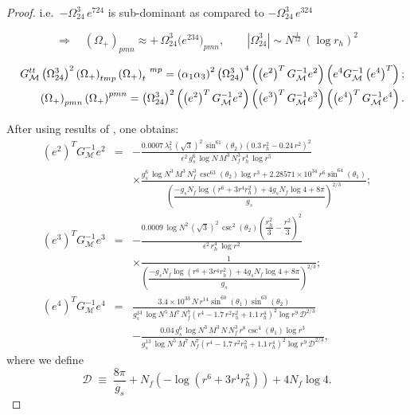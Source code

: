 \documentclass[a4paper,11pt,fleqn]{article}
\theoremstyle{plain}
\theoremstyle{definition}
\newcommand{\rh}{r_h}
\newcommand{\logN}{\log N}
\newcommand{\gsNf}{g_s N_f}
\newcommand{\logr}{\log r}
\begin{document}
\begin{proof}
\noindent i.e.\ $-\Omega_{24}^3\,e^{724}$ is sub-dominant as compared to
$-\Omega_{24}^3\,e^{324}$

\[
  \Rightarrow\quad
  \left(\Omega_{+}\right)_{pmn}
  \approx +\,\Omega_{24}^3\bigl(e^{234}\bigr)_{pmn},
  \qquad
  \left|\Omega_{24}^3\right|
  \sim N^{\frac{1}{12}}\, (\log r_h)^2
\]

\begin{eqnarray}
\label{Lag_B-ii}
& & G_{\cal M}^{tt}\left(\Omega^3_{24}\right)^2\left(\Omega_+\right)_{tmp}\left(\Omega_+\right)_t^{\ \ mp} = \left(\alpha_1\alpha_3\right)^2\left(\Omega^3_{24}\right)^4\left(\left(e^2\right)^TG_{\cal M}^{-1}e^2\right)\left(e^4 G_{\cal M}^{-1}\left(e^4\right)^T\right);\nonumber\\
& & \left(\Omega_+\right)_{pmn}\left(\Omega_+\right)^{pmn}=\left(\Omega^3_{24}\right)^2 \left(\left(e^2\right)^TG_{\cal M}^{-1}e^2\right) \left(\left(e^3\right)^TG_{\cal M}^{-1}e^3 \right)\left(\left(e^4\right)^TG_{\cal M}^{-1}e^4\right).
\end{eqnarray}



After using results of \cite{OR4}, one obtains:
%
\begin{eqnarray}
\label{einvGeTs}
\left(e^2\right)^T G_{\mathcal{M}}^{-1} e^2
&=& -\frac{0.0007\,\lambda_5^2\,(\sqrt{3})^2\,
            \sin^{61}\!\left(\theta_2\right)
            \left(0.3\,\rh^2 - 0.24\,r^2\right)^2}
          {\epsilon^2\,g_s^6\,\logN\,M^3\,N_f^3\,\rh^4\,\logr^5}
\nonumber\\[4pt]
&& \times
   \frac{g_s^6\,\logN^3\,M^3\,N_f^3\,
         \csc^{63}\!\left(\theta_2\right)\logr^3
         + 2.28571\times10^{34}\,r^6\sin^{64}\!\left(\theta_1\right)}
        {\left(\dfrac{-\gsNf\log\!\left(r^6+3r^4\rh^2\right)
                      +4\gsNf\log 4+8\pi}
                     {g_s}\right)^{2/3}};
\nonumber\\[8pt]
%
\left(e^3\right)^T G_{\mathcal{M}}^{-1} e^3
&=& -\frac{0.0009\,\logN^2\,(\sqrt{3})^2\,\csc^2\!\left(\theta_2\right)
           \left(\dfrac{\rh^2}{3}-\dfrac{r^2}{3}\right)^2}
          {\epsilon^2\,\rh^4\,\logr^2}
\nonumber\\[4pt]
&& \times
   \frac{1}{\left(\dfrac{-\gsNf\log\!\left(r^6+3r^4\rh^2\right)
                         +4\gsNf\log 4+8\pi}
                        {g_s}\right)^{2/3}};
\nonumber\\[8pt]
%
\left(e^4\right)^T G_{\mathcal{M}}^{-1} e^4
&=& \frac{3.4\times10^{33}\,N\,r^{14}
          \sin^{60}\!\left(\theta_1\right)\sin^{63}\!\left(\theta_2\right)}
         {g_s^{13}\,\logN^5\,M^7\,N_f^7
          \left(r^4 - 1.7\,r^2\rh^2 + 1.1\,\rh^4\right)^2
          \logr^9\,\mathcal{D}^{2/3}}
\nonumber\\[4pt]
&& -\frac{0.04\,g_s^6\,\logN^3\,M^3\,N\,N_f^3\,r^8
          \csc^4\!\left(\theta_1\right)\logr^3}
         {g_s^{13}\,\logN^5\,M^7\,N_f^7
          \left(r^4 - 1.7\,r^2\rh^2 + 1.1\,\rh^4\right)^2
          \logr^9\,\mathcal{D}^{2/3}},
\end{eqnarray}
%
where we define
\begin{equation}
\mathcal{D} \;\equiv\;
\frac{8\pi}{g_s} + N_f\!\left(-\log\!\left(r^6+3r^4\rh^2\right)\right)
+ 4N_f\log 4.
\end{equation}


\end{proof}
\end{document}
